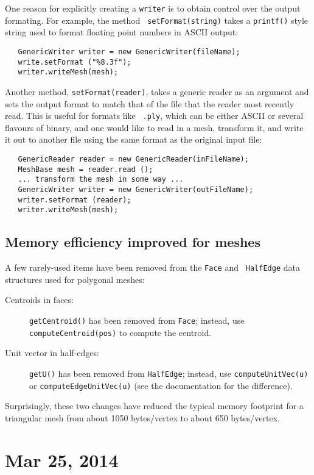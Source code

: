 \documentclass{article}
\begin{document}
One reason for explicitly creating a {\tt writer} is to obtain
control over the output formating. For example, the method {\tt
setFormat(string)} takes a {\tt printf()} style string used
to format floating point numbers in ASCII output:
\begin{lstlisting}
   GenericWriter writer = new GenericWriter(fileName);
   write.setFormat ("%8.3f");
   writer.writeMesh(mesh);
\end{lstlisting}
Another method, {\tt setFormat(reader)}, takes a generic reader as an
argument and sets the output format to match that of the file that the
reader most recently read. This is useful for formats like {\tt
.ply}, which can be either ASCII or several flavours of binary,
and one would like to read in a mesh, transform it, and write
it out to another file using the same format as the original input file:
\begin{lstlisting}
   GenericReader reader = new GenericReader(inFileName);
   MeshBase mesh = reader.read ();
   ... transform the mesh in some way ...
   GenericWriter writer = new GenericWriter(outFileName);
   writer.setFormat (reader);
   writer.writeMesh(mesh);
\end{lstlisting}

\subsection*{Memory efficiency improved for meshes}

A few rarely-used items have been removed from the {\tt Face} and {\tt
HalfEdge} data structures used for polygonal meshes:

\begin{description}

\item [Centroids in faces:] {\tt getCentroid()} has been removed
from {\tt Face}; instead, use {\tt computeCentroid(pos)} to compute
the centroid.

\item [Unit vector in half-edges:] {\tt getU()} has
been removed from {\tt HalfEdge}; instead, use {\tt computeUnitVec(u)}
or {\tt computeEdgeUnitVec(u)} (see the documentation for the
difference).

\end{description}

Surprisingly, these two changes have reduced the typical memory
footprint for a triangular mesh from about 1050 bytes/vertex to about
650 bytes/vertex.

\section*{Mar 25, 2014}
\end{document}
